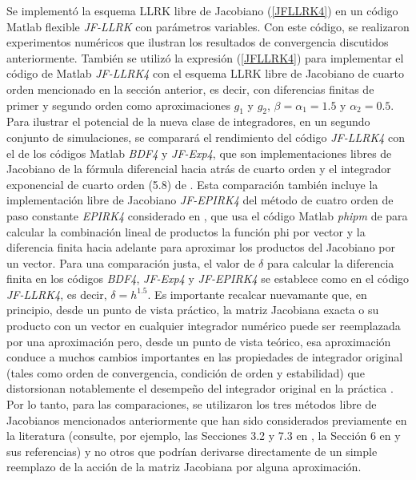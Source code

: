 Se implementó la esquema LLRK libre de Jacobiano (\ref{JFLLRK4}) en un código Matlab flexible \textit{JF-LLRK} con parámetros variables. Con este código, se realizaron experimentos numéricos que ilustran los resultados de convergencia discutidos anteriormente. También se utilizó la expresión (\ref{JFLLRK4}) para implementar el código de Matlab \textit{JF-LLRK4} con el esquema LLRK libre de Jacobiano de cuarto orden mencionado en la sección anterior, es decir, con diferencias finitas de primer y segundo orden como aproximaciones $g_1$ y $g_2$, $\beta=\alpha_1=1.5$ y $\alpha_2=0.5$. Para ilustrar el potencial de la nueva clase de integradores, en un segundo conjunto de simulaciones, se comparará el rendimiento del código \textit{JF-LLRK4} con el de los códigos Matlab \textit{BDF4} y \textit{JF-Exp4}, que son implementaciones libres de Jacobiano de la fórmula diferencial hacia atrás de cuarto orden \cite{hairer1993solving} y el integrador exponencial de cuarto orden (5.8) de \cite{hochbruck1998exponential}. Esta comparación también incluye la implementación libre de Jacobiano \textit{JF-EPIRK4} del método de cuatro orden de paso constante \textit{EPIRK4} \cite{rainwater2016new} considerado en \cite{einkemmer2017performance}, que usa el código Matlab \textit {phipm} de \cite{niesen2012algorithm} para calcular la combinación lineal de productos  la función phi por vector y la diferencia finita hacia adelante para aproximar los productos del Jacobiano por un vector. Para una comparación justa, el valor de $\delta$ para calcular la diferencia finita en los códigos \textit{BDF4}, \textit{JF-Exp4} y \textit{JF-EPIRK4} se establece como en el código \textit {JF-LLRK4}, es decir, $\delta=h^{1.5}$. Es importante recalcar nuevamante que, en principio, desde un punto de vista práctico, la matriz Jacobiana exacta o su producto con un vector en cualquier integrador numérico puede ser reemplazada por una aproximación pero, desde un punto de vista teórico, esa aproximación conduce a muchos cambios importantes en las propiedades de integrador original (tales como orden de convergencia, condición de orden y estabilidad) que distorsionan notablemente el desempeño del integrador original en la práctica \cite{hairer1993solving,hochbruck1998exponential, tranquilli2014rosenbrock}. Por lo tanto, para las comparaciones, se utilizaron los tres métodos libre de Jacobianos mencionados anteriormente que han sido considerados previamente en la literatura (consulte, por ejemplo, las Secciones 3.2 y 7.3 en \cite{hochbruck1998exponential}, la Sección 6 en \cite{einkemmer2017performance} y sus referencias) y no otros que podrían derivarse directamente de un simple reemplazo de la acción de la matriz Jacobiana por alguna aproximación.


